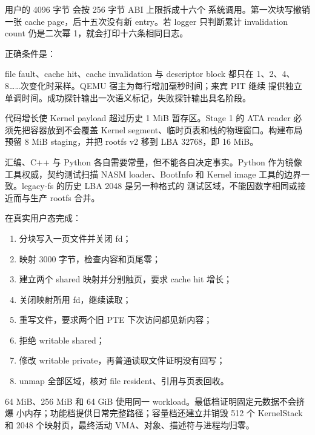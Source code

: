 用户的 4096 字节  会按 256 字节 ABI 上限拆成十六个
系统调用。第一次块写撤销一张 cache page，后十五次没有新 entry。若 logger
只判断累计 invalidation count 仍是二次幂 1，就会打印十六条相同日志。

正确条件是：

\begin{center}
\end{center}

file fault、cache hit、cache invalidation 与 descriptor block 都只在
1、2、4、8……次变化时采样。QEMU 宿主为每行增加毫秒时间；来宾 PIT 继续
提供独立单调时间。成功探针输出一次语义标记，失败探针输出具名阶段。

代码增长使 Kernel payload 超过历史 1 MiB 暂存区。Stage 1 的 ATA reader
必须先把容器放到不会覆盖 Kernel segment、临时页表和栈的物理窗口。构建布局
预留 8 MiB  staging，并把 rootfs v2 移到
LBA 32768，即 16 MiB。

汇编、C++ 与 Python 各自需要常量，但不能各自决定事实。Python
 作为镜像工具权威，契约测试扫描 NASM loader、BootInfo
和 Kernel image 工具的边界一致。legacy-fs 的历史 LBA 2048 是另一种格式的
测试区域，不能因数字相同或接近而与生产 rootfs 合并。

 在真实用户态完成：

\begin{enumerate}[label=\arabic*.]
  \item 分块写入一页文件并关闭 fd；
  \item 映射 3000 字节，检查内容和页尾零；
  \item 建立两个 shared 映射并分别触页，要求 cache hit 增长；
  \item 关闭映射所用 fd，继续读取；
  \item 重写文件，要求两个旧 PTE 下次访问都见新内容；
  \item 拒绝 writable shared；
  \item 修改 writable private，再普通读取文件证明没有回写；
  \item unmap 全部区域，核对 file resident、引用与页表回收。
\end{enumerate}

64 MiB、256 MiB 和 64 GiB 使用同一 workload。最低档证明固定元数据不会挤爆
小内存；功能档提供日常完整路径；容量档还建立并销毁 512 个 KernelStack 和
2048 个映射页，最终活动 VMA、对象、描述符与进程均归零。

